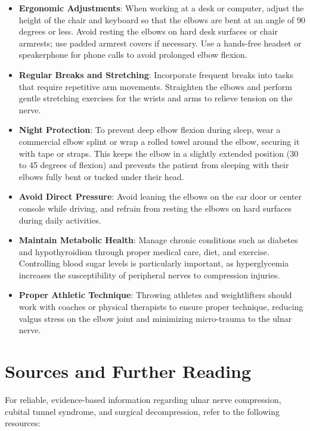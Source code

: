 \begin{itemize}
  \item \textbf{Ergonomic Adjustments}: When working at a desk or computer, adjust the height of the chair and keyboard so that the elbows are bent at an angle of 90 degrees or less. Avoid resting the elbows on hard desk surfaces or chair armrests; use padded armrest covers if necessary. Use a hands-free headset or speakerphone for phone calls to avoid prolonged elbow flexion.
  \item \textbf{Regular Breaks and Stretching}: Incorporate frequent breaks into tasks that require repetitive arm movements. Straighten the elbows and perform gentle stretching exercises for the wrists and arms to relieve tension on the nerve.
  \item \textbf{Night Protection}: To prevent deep elbow flexion during sleep, wear a commercial elbow splint or wrap a rolled towel around the elbow, securing it with tape or straps. This keeps the elbow in a slightly extended position (30 to 45 degrees of flexion) and prevents the patient from sleeping with their elbows fully bent or tucked under their head.
  \item \textbf{Avoid Direct Pressure}: Avoid leaning the elbows on the car door or center console while driving, and refrain from resting the elbows on hard surfaces during daily activities.
  \item \textbf{Maintain Metabolic Health}: Manage chronic conditions such as diabetes and hypothyroidism through proper medical care, diet, and exercise. Controlling blood sugar levels is particularly important, as hyperglycemia increases the susceptibility of peripheral nerves to compression injuries.
  \item \textbf{Proper Athletic Technique}: Throwing athletes and weightlifters should work with coaches or physical therapists to ensure proper technique, reducing valgus stress on the elbow joint and minimizing micro-trauma to the ulnar nerve.
\end{itemize}

\section*{Sources and Further Reading}
For reliable, evidence-based information regarding ulnar nerve compression, cubital tunnel syndrome, and surgical decompression, refer to the following resources:

